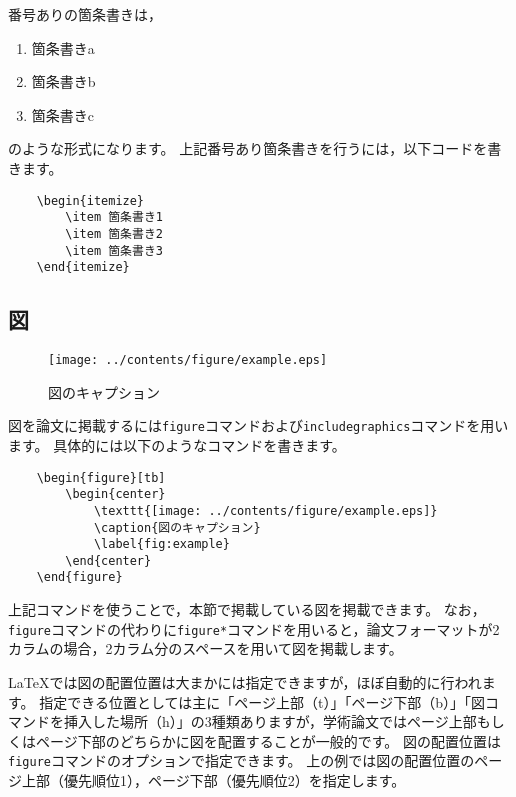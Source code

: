 番号ありの箇条書きは，
\begin{enumerate}
\item 箇条書きa
\item 箇条書きb
\item 箇条書きc
\end{enumerate}
のような形式になります。
上記番号あり箇条書きを行うには，以下コードを書きます。
\begin{verbatim}
    \begin{itemize}
        \item 箇条書き1
        \item 箇条書き2
        \item 箇条書き3
    \end{itemize}
\end{verbatim}


\subsection{図}

\begin{figure*}[tb]
\begin{center}
\texttt{[image: ../contents/figure/example.eps]}
\caption{図のキャプション}
\label{fig:example}
\end{center}
\end{figure*}

図を論文に掲載するには{\tt figure}コマンドおよび{\tt includegraphics}コマンドを用います。
具体的には以下のようなコマンドを書きます。

\begin{verbatim}
    \begin{figure*}[tb]
        \begin{center}
            \texttt{[image: ../contents/figure/example.eps]}
            \caption{図のキャプション}
            \label{fig:example}
        \end{center}
    \end{figure*}
\end{verbatim}
上記コマンドを使うことで，本節で掲載している図を掲載できます。
なお，{\tt figure}コマンドの代わりに{\tt figure*}コマンドを用いると，論文フォーマットが2カラムの場合，2カラム分のスペースを用いて図を掲載します。

LaTeXでは図の配置位置は大まかには指定できますが，ほぼ自動的に行われます。
指定できる位置としては主に「ページ上部（t）」「ページ下部（b）」「図コマンドを挿入した場所（h）」の3種類ありますが，学術論文ではページ上部もしくはページ下部のどちらかに図を配置することが一般的です。
図の配置位置は{\tt figure}コマンドのオプションで指定できます。
上の例では図の配置位置のページ上部（優先順位1），ページ下部（優先順位2）を指定します。

